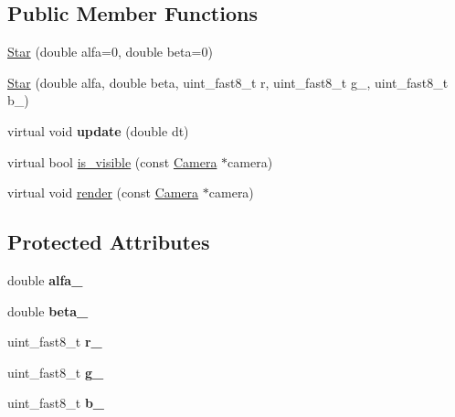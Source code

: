 \subsection*{Public Member Functions}
\begin{DoxyCompactItemize}
\item 
\hyperlink{class_star_ac79a6fb3556d6735f063cbc28fb73397}{Star} (double alfa=0, double beta=0)
\item 
\hyperlink{class_star_a125afff584b315791b7345151f978c99}{Star} (double alfa, double beta, uint\+\_\+fast8\+\_\+t r, uint\+\_\+fast8\+\_\+t g\+\_\+, uint\+\_\+fast8\+\_\+t b\+\_\+)
\item 
virtual void {\bfseries update} (double dt)\hypertarget{class_star_a6329b84f6a4434f93f744475336758da}{}\label{class_star_a6329b84f6a4434f93f744475336758da}

\item 
virtual bool \hyperlink{class_star_ac196fa232107776abeddba91ccdc3374}{is\+\_\+visible} (const \hyperlink{class_camera}{Camera} $\ast$camera)
\item 
virtual void \hyperlink{class_star_af0cb257b2c6e44cd26d75113e5e6675d}{render} (const \hyperlink{class_camera}{Camera} $\ast$camera)
\end{DoxyCompactItemize}
\subsection*{Protected Attributes}
\begin{DoxyCompactItemize}
\item 
double {\bfseries alfa\+\_\+}\hypertarget{class_star_acbc2ce5b635761779c628b82eebaa914}{}\label{class_star_acbc2ce5b635761779c628b82eebaa914}

\item 
double {\bfseries beta\+\_\+}\hypertarget{class_star_ac560d7b5ff53fea9b4c816bd0104fe9a}{}\label{class_star_ac560d7b5ff53fea9b4c816bd0104fe9a}

\item 
uint\+\_\+fast8\+\_\+t {\bfseries r\+\_\+}\hypertarget{class_star_afc7dd12c9f1876daec0d8900310df9d3}{}\label{class_star_afc7dd12c9f1876daec0d8900310df9d3}

\item 
uint\+\_\+fast8\+\_\+t {\bfseries g\+\_\+}\hypertarget{class_star_afacfcae0967a657fe5764e78439c2e57}{}\label{class_star_afacfcae0967a657fe5764e78439c2e57}

\item 
uint\+\_\+fast8\+\_\+t {\bfseries b\+\_\+}\hypertarget{class_star_abd9108ee6d13e26ef4a220777c2f40fa}{}\label{class_star_abd9108ee6d13e26ef4a220777c2f40fa}

\end{DoxyCompactItemize}


